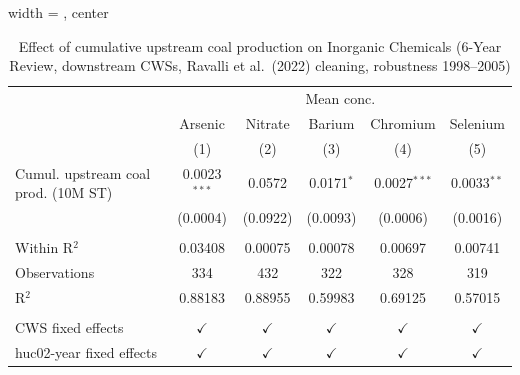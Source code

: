 
\begin{table}[htbp]
   
   \caption{\label{tab:6yr_huc02fe_inorg_ravalli_2005} Effect of cumulative upstream coal production on Inorganic Chemicals (6-Year Review, downstream CWSs, Ravalli et al.~(2022) cleaning, robustness 1998--2005)}
   \bigskip
   
   \centering
   
   \begin{adjustbox}{width = \textwidth, center}
      
      
      \begin{tabular}{lccccc}
         \toprule
         
          & \multicolumn{5}{c}{Mean conc.}\\
         
                                             & Arsenic        & Nitrate       & Barium        & Chromium       & Selenium \\   
         
                                             & (1)            & (2)           & (3)           & (4)            & (5)\\  
         
         \midrule 
         Cumul. upstream coal prod. (10M ST) & 0.0023$^{***}$ & 0.0572        & 0.0171$^{*}$  & 0.0027$^{***}$ & 0.0033$^{**}$\\   
                                             & (0.0004)       & (0.0922)      & (0.0093)      & (0.0006)       & (0.0016)\\   
         
          \\
         
         Within R$^2$                        & 0.03408        & 0.00075       & 0.00078       & 0.00697        & 0.00741\\  
         Observations                        & 334            & 432           & 322           & 328            & 319\\  
         R$^2$                               & 0.88183        & 0.88955       & 0.59983       & 0.69125        & 0.57015\\  
         
          \\
         
         CWS fixed effects                   & $\checkmark$   & $\checkmark$  & $\checkmark$  & $\checkmark$   & $\checkmark$\\   
         huc02-year fixed effects            & $\checkmark$   & $\checkmark$  & $\checkmark$  & $\checkmark$   & $\checkmark$\\   
         

\end{tabular}
\end{adjustbox}
\end{table}

